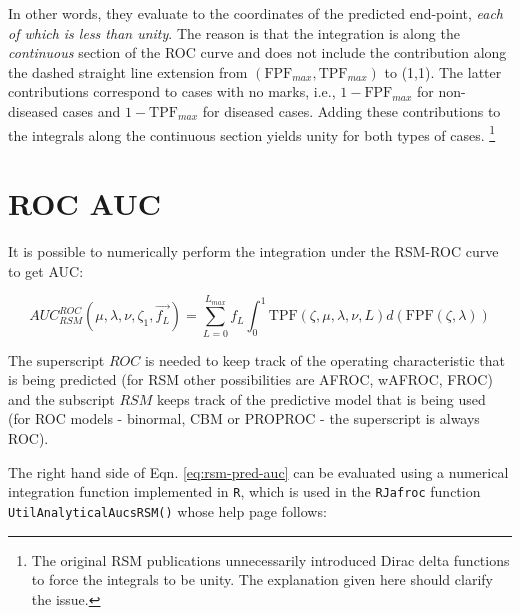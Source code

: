 \documentclass[
]{book}
\begin{document}
In other words, they evaluate to the coordinates of the predicted end-point, \emph{each of which is less than unity}. The reason is that the integration is along the \emph{continuous} section of the ROC curve and does not include the contribution along the dashed straight line extension from \(\left ( \text{FPF}_{max}, \text{TPF}_{max} \right )\) to (1,1). The latter contributions correspond to cases with no marks, i.e., \(1 - \text{FPF}_{max}\) for non-diseased cases and \(1 - \text{TPF}_{max}\) for diseased cases. Adding these contributions to the integrals along the continuous section yields unity for both types of cases. \footnote{The original RSM publications \citep{chakraborty2006search, chakraborty2006roc} unnecessarily introduced Dirac delta functions to force the integrals to be unity. The explanation given here should clarify the issue.}

\hypertarget{rsm-pred-roc-curve-auc}{%
\section{ROC AUC}\label{rsm-pred-roc-curve-auc}}

It is possible to numerically perform the integration under the RSM-ROC curve to get AUC:

\begin{equation}
AUC_{RSM}^{ROC}\left ( \mu, \lambda, \nu,  \zeta_1, \overrightarrow{f_L} \right ) = \sum_{L=0}^{L_{max}} f_L \int_{0}^{1} \text{TPF}\left (\zeta,  \mu, \lambda, \nu, L \right ) d\left ( \text{FPF}\left (\zeta, \lambda \right ) \right )
\label{eq:rsm-pred-auc}
\end{equation}

The superscript \(ROC\) is needed to keep track of the operating characteristic that is being predicted (for RSM other possibilities are AFROC, wAFROC, FROC) and the subscript \(RSM\) keeps track of the predictive model that is being used (for ROC models - binormal, CBM or PROPROC - the superscript is always ROC).

The right hand side of Eqn. \eqref{eq:rsm-pred-auc} can be evaluated using a numerical integration function implemented in \texttt{R}, which is used in the \texttt{RJafroc} function \texttt{UtilAnalyticalAucsRSM()} whose help page follows:
\end{document}
